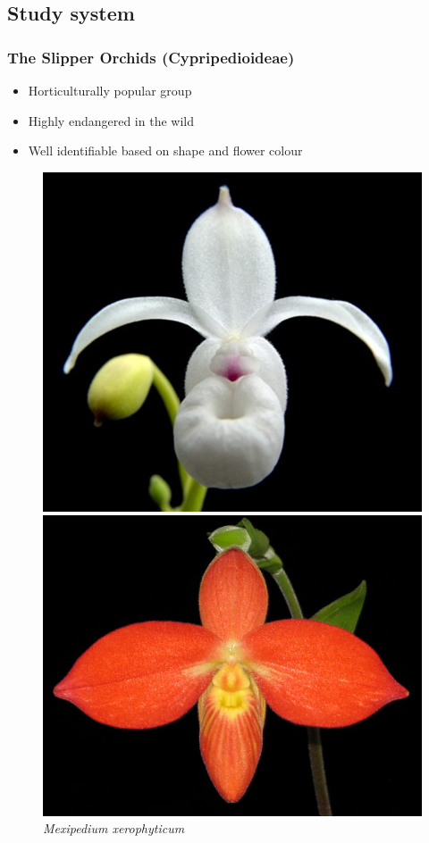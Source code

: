 \documentclass[]{beamer}
\begin{document}
	\subsection{Study system}
    \begin{frame}        	
        \frametitle{The Slipper Orchids (Cypripedioideae)}        
        \begin{itemize}
            \item Horticulturally popular group
            \item Highly endangered in the wild
            \item Well identifiable based on shape and flower colour
        \end{itemize}

        \begin{figure}[!htb]
              \includegraphics[width=\linewidth]{Mexipedium_xerophyticum}
              \caption*{\textit{Mexipedium xerophyticum}}
            \endminipage\hfill
              \includegraphics[width=\linewidth]{Phragmipedium_besseae}

\end{figure}
\end{frame}
\end{document}
